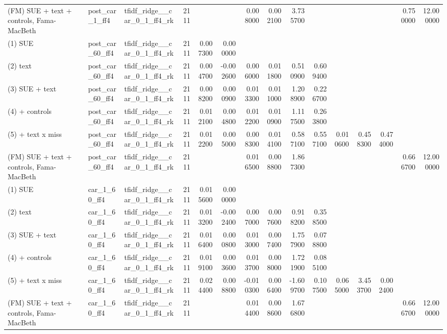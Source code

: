 \begin{table}
\begin{tabular}{lllrrrrrrrrrrrr}
(FM) SUE + text + controls, Fama-MacBeth & post\_car\_1\_ff4 & tfidf\_ridge\_\_car\_0\_1\_ff4\_rk & 2111 &  &  & 0.008000 & 0.002100 & 3.735700 &  &  &  &  & 0.750000 & 12.000000 \\
(1) SUE & post\_car\_60\_ff4 & tfidf\_ridge\_\_car\_0\_1\_ff4\_rk & 2111 & 0.007300 & 0.000000 &  &  &  &  &  &  &  &  &  \\
(2) text & post\_car\_60\_ff4 & tfidf\_ridge\_\_car\_0\_1\_ff4\_rk & 2111 & 0.004700 & -0.002600 & 0.006000 & 0.011800 & 0.510900 & 0.609400 &  &  &  &  &  \\
(3) SUE + text & post\_car\_60\_ff4 & tfidf\_ridge\_\_car\_0\_1\_ff4\_rk & 2111 & 0.008200 & 0.000900 & 0.013300 & 0.011000 & 1.208900 & 0.226700 &  &  &  &  &  \\
(4) + controls & post\_car\_60\_ff4 & tfidf\_ridge\_\_car\_0\_1\_ff4\_rk & 2111 & 0.012100 & 0.004800 & 0.012200 & 0.010900 & 1.117500 & 0.263800 &  &  &  &  &  \\
(5) + text x miss & post\_car\_60\_ff4 & tfidf\_ridge\_\_car\_0\_1\_ff4\_rk & 2111 & 0.012200 & 0.005000 & 0.008300 & 0.014100 & 0.587100 & 0.557100 & 0.010600 & 0.458300 & 0.474000 &  &  \\
(FM) SUE + text + controls, Fama-MacBeth & post\_car\_60\_ff4 & tfidf\_ridge\_\_car\_0\_1\_ff4\_rk & 2111 &  &  & 0.016500 & 0.008800 & 1.867300 &  &  &  &  & 0.666700 & 12.000000 \\
(1) SUE & car\_1\_60\_ff4 & tfidf\_ridge\_\_car\_0\_1\_ff4\_rk & 2111 & 0.015600 & 0.000000 &  &  &  &  &  &  &  &  &  \\
(2) text & car\_1\_60\_ff4 & tfidf\_ridge\_\_car\_0\_1\_ff4\_rk & 2111 & 0.013200 & -0.002400 & 0.007000 & 0.007600 & 0.918200 & 0.358500 &  &  &  &  &  \\
(3) SUE + text & car\_1\_60\_ff4 & tfidf\_ridge\_\_car\_0\_1\_ff4\_rk & 2111 & 0.016400 & 0.000800 & 0.013000 & 0.007400 & 1.757900 & 0.078800 &  &  &  &  &  \\
(4) + controls & car\_1\_60\_ff4 & tfidf\_ridge\_\_car\_0\_1\_ff4\_rk & 2111 & 0.019100 & 0.003600 & 0.013700 & 0.008000 & 1.721900 & 0.085100 &  &  &  &  &  \\
(5) + text x miss & car\_1\_60\_ff4 & tfidf\_ridge\_\_car\_0\_1\_ff4\_rk & 2111 & 0.024400 & 0.008800 & -0.010300 & 0.006400 & -1.609700 & 0.107500 & 0.065000 & 3.453700 & 0.002400 &  &  \\
(FM) SUE + text + controls, Fama-MacBeth & car\_1\_60\_ff4 & tfidf\_ridge\_\_car\_0\_1\_ff4\_rk & 2111 &  &  & 0.014400 & 0.008600 & 1.676800 &  &  &  &  & 0.666700 & 12.000000 \\

\end{tabular}
\end{table}
